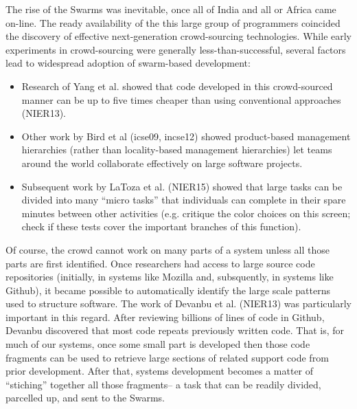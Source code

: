 \documentclass[journal]{IEEEtran}
\newcommand{\bi}{\begin{itemize}}
\newcommand{\ei}{\end{itemize}}
\begin{document}
The rise of the Swarms was inevitable, once all of
India and all or Africa came on-line.  The ready
availability of the this large group of programmers
coincided the discovery of effective next-generation
crowd-sourcing technologies.  While early
experiments in crowd-sourcing were generally
less-than-successful, several factors lead to
widespread adoption of swarm-based development:
\bi
\item
Research of Yang et al. showed that code developed
in this crowd-sourced manner can be up to five times
cheaper than using conventional approaches (NIER13).
\item
Other work by Bird et al (icse09, incse12) showed
product-based management hierarchies (rather than
locality-based management hierarchies) let teams
around the world collaborate effectively on large
software projects.
\item
  Subsequent work by LaToza et
al. (NIER15) showed that large tasks can be divided
into many ``micro tasks'' that individuals can
complete in their spare minutes between other
activities (e.g. critique the color choices on this
screen; check if these tests cover the important
branches of this function).
\ei
Of course, the crowd cannot work on many parts of a
system unless all those parts are first
identified. Once researchers had access to large
source code repositories (initially, in systems like
Mozilla and, subsquently, in systems like Github),
it became possible to automatically identify the
large scale patterns used to structure software. The
work of Devanbu et al. (NIER13) was particularly
important in this regard.  After reviewing billions
of lines of code in Github, Devanbu discovered that
most code repeats previously written code. That is,
for much of our systems, once some small part is
developed then those code fragments can be used to
retrieve large sections of related support code from
prior development. After that, systems development
becomes a matter of ``stiching'' together all those
fragments-- a task that can be readily divided,
parcelled up, and sent to the Swarms.
\end{document}

